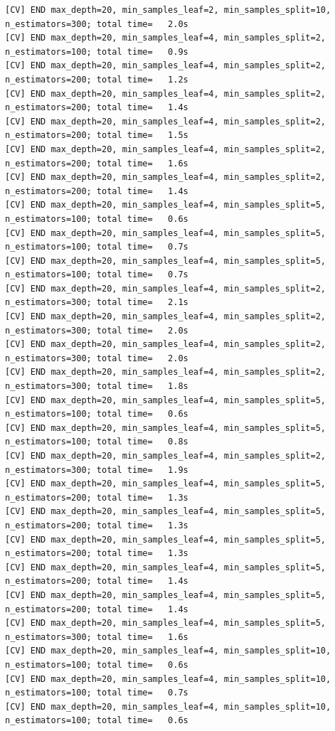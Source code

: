 \documentclass[
  11pt,
  letterpaper,
  DIV=11,
  numbers=noendperiod]{scrartcl}
\begin{document}
\begin{verbatim}
[CV] END max_depth=20, min_samples_leaf=2, min_samples_split=10, n_estimators=300; total time=   2.0s
[CV] END max_depth=20, min_samples_leaf=4, min_samples_split=2, n_estimators=100; total time=   0.9s
[CV] END max_depth=20, min_samples_leaf=4, min_samples_split=2, n_estimators=200; total time=   1.2s
[CV] END max_depth=20, min_samples_leaf=4, min_samples_split=2, n_estimators=200; total time=   1.4s
[CV] END max_depth=20, min_samples_leaf=4, min_samples_split=2, n_estimators=200; total time=   1.5s
[CV] END max_depth=20, min_samples_leaf=4, min_samples_split=2, n_estimators=200; total time=   1.6s
[CV] END max_depth=20, min_samples_leaf=4, min_samples_split=2, n_estimators=200; total time=   1.4s
[CV] END max_depth=20, min_samples_leaf=4, min_samples_split=5, n_estimators=100; total time=   0.6s
[CV] END max_depth=20, min_samples_leaf=4, min_samples_split=5, n_estimators=100; total time=   0.7s
[CV] END max_depth=20, min_samples_leaf=4, min_samples_split=5, n_estimators=100; total time=   0.7s
[CV] END max_depth=20, min_samples_leaf=4, min_samples_split=2, n_estimators=300; total time=   2.1s
[CV] END max_depth=20, min_samples_leaf=4, min_samples_split=2, n_estimators=300; total time=   2.0s
[CV] END max_depth=20, min_samples_leaf=4, min_samples_split=2, n_estimators=300; total time=   2.0s
[CV] END max_depth=20, min_samples_leaf=4, min_samples_split=2, n_estimators=300; total time=   1.8s
[CV] END max_depth=20, min_samples_leaf=4, min_samples_split=5, n_estimators=100; total time=   0.6s
[CV] END max_depth=20, min_samples_leaf=4, min_samples_split=5, n_estimators=100; total time=   0.8s
[CV] END max_depth=20, min_samples_leaf=4, min_samples_split=2, n_estimators=300; total time=   1.9s
[CV] END max_depth=20, min_samples_leaf=4, min_samples_split=5, n_estimators=200; total time=   1.3s
[CV] END max_depth=20, min_samples_leaf=4, min_samples_split=5, n_estimators=200; total time=   1.3s
[CV] END max_depth=20, min_samples_leaf=4, min_samples_split=5, n_estimators=200; total time=   1.3s
[CV] END max_depth=20, min_samples_leaf=4, min_samples_split=5, n_estimators=200; total time=   1.4s
[CV] END max_depth=20, min_samples_leaf=4, min_samples_split=5, n_estimators=200; total time=   1.4s
[CV] END max_depth=20, min_samples_leaf=4, min_samples_split=5, n_estimators=300; total time=   1.6s
[CV] END max_depth=20, min_samples_leaf=4, min_samples_split=10, n_estimators=100; total time=   0.6s
[CV] END max_depth=20, min_samples_leaf=4, min_samples_split=10, n_estimators=100; total time=   0.7s
[CV] END max_depth=20, min_samples_leaf=4, min_samples_split=10, n_estimators=100; total time=   0.6s

\end{verbatim}
\end{document}
